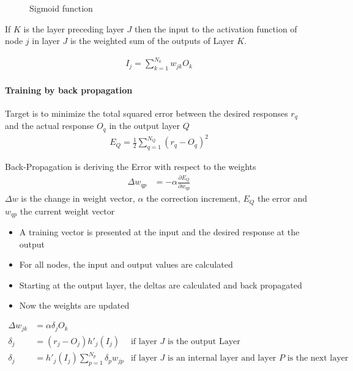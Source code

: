 \begin{figure}[htp]
\centering

\caption{Sigmoid function}
\label{fig:sigmoid}
\end{figure}

If $K$ is the layer preceding layer $J$ then the input to the activation function of node $j$ in layer $J$ is the weighted sum of the outputs of Layer $K$.

\begin{align*}
I_j = \sum_{k=1}^{N_k}w_{jk}O_k
\end{align*}

\paragraph{Training by back propagation}
Target is to minimize the total squared error between the desired responses
$r_q$ and the actual response $O_q$ in the output layer $Q$
\begin{align*}
	E_Q = \frac{1}{2} \sum_{q=1}^{N_Q}(r_q-O_q)^2
\end{align*}

Back-Propagation is deriving the Error with respect to the weights
\begin{align*}
	\Delta w_{qp} &= -\alpha \frac{\partial E_Q}{\partial w_{qp}}
\end{align*}
$\Delta w$ is the change in weight vector, $\alpha$ the correction increment,
$E_Q$ the error and $w_{qp}$ the current weight vector

\begin{itemize}
\item A training vector is presented at
the input and the desired response
at the output
\item For all nodes, the input and output values are calculated
\item Starting at the output layer, the
deltas are calculated and back
propagated
\item Now the weights are updated
\end{itemize}


\begin{align*}
\Delta w_{jk} &= \alpha \delta_j O_k& \\
\delta_j &= (r_j-O_j) h'_j(I_j) & \text{if layer $J$ is the output Layer} \\
\delta_j &= h'_j(I_j) \sum_{p=1}^{N_p}\delta_p w_{jp} & \text{if layer $J$ is an internal layer and layer $P$ is the next layer}
\end{align*}

